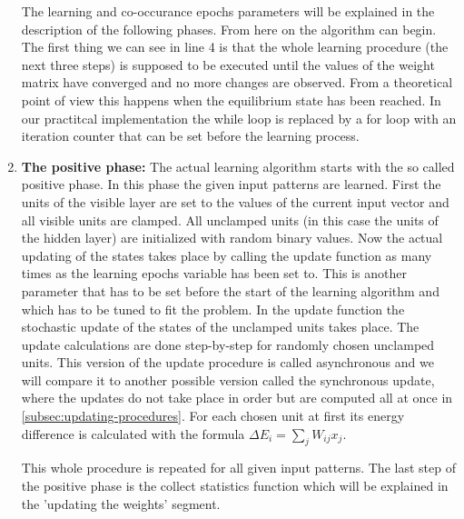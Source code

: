 \documentclass[12pt,twoside]{article}
\theoremstyle{plain}
\theoremstyle{definition}
\theoremstyle{remark}
\begin{document}
\begin{enumerate}
        The learning and co-occurance epochs parameters will be explained in the description of the following phases.\newline
        From here on the algorithm can begin. The first thing we can see in line 4 is that the whole learning procedure (the next three steps) is
        supposed to be executed until the values of the weight matrix have converged and no more changes are observed.
        From a theoretical point of view this happens when the equilibrium state has been reached. 
        In our practitcal implementation the while loop is replaced by a for loop with an iteration counter that can be set before the learning process.
    \item \textbf{The positive phase:}\newline
        The actual learning algorithm starts with the so called positive phase. In this phase the given input patterns are learned.
        First the units of the visible layer are set to the values of the current input vector and all visible units are clamped.
        All unclamped units (in this case the units of the hidden layer) are initialized with random binary values.
        Now the actual updating of the states takes place by calling the update function as many times as the learning epochs variable has been set to.
        This is another parameter that has to be set before the start of the learning algorithm and which has to be tuned to fit the problem.\newline
        In the update function the stochastic update of the states of the unclamped units takes place. The update calculations are done
        step-by-step for randomly chosen unclamped units. This version of the update procedure is called asynchronous and we will
        compare it to another possible version called the synchronous update, where the updates do not take place in order
        but are computed all at once in \cref{subsec:updating-procedures}.\newline
        For each chosen unit at first its energy difference is calculated with the formula $\Delta E_i = \sum_j W_{ij} x_j$. 
        

        This whole procedure is repeated for all given input patterns. The last step of the positive phase is the collect statistics function which will be explained in
        the 'updating the weights' segment.



\end{enumerate}
\end{document}
